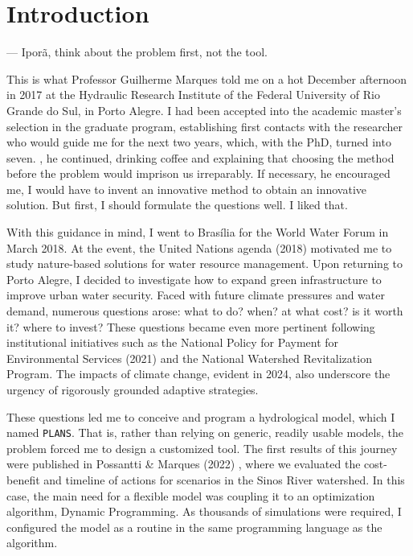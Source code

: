 \documentclass[./main_en.tex]{subfiles}
\begin{document}
\chapter{Introduction}

\setlength{\parskip}{\myparskip}

--- Iporã, think about the problem first, not the tool.

\vspace{1.0cm}

\noindent This is what Professor Guilherme Marques told me on a hot December afternoon in 2017 at the Hydraulic Research Institute of the Federal University of Rio Grande do Sul, in Porto Alegre. I had been accepted into the academic master's selection in the graduate program, establishing first contacts with the researcher who would guide me for the next two years, which, with the PhD, turned into seven. , he continued, drinking coffee and explaining that choosing the method before the problem would imprison us irreparably. If necessary, he encouraged me, I would have to invent an innovative method to obtain an innovative solution. But first, I should formulate the questions well. I liked that.

\par With this guidance in mind, I went to Brasília for the World Water Forum in March 2018. At the event, the United Nations agenda (2018) \cite{un2018} motivated me to study nature-based solutions for water resource management. Upon returning to Porto Alegre, I decided to investigate how to expand green infrastructure to improve urban water security. Faced with future climate pressures and water demand, numerous questions arose: what to do? when? at what cost? is it worth it? where to invest? These questions became even more pertinent following institutional initiatives such as the National Policy for Payment for Environmental Services (2021) \cite{brasil2021} and the National Watershed Revitalization Program. The impacts of climate change, evident in 2024, also underscore the urgency of rigorously grounded adaptive strategies.

\par These questions led me to conceive and program a hydrological model, which I named \texttt{PLANS}. That is, rather than relying on generic, readily usable models, the problem forced me to design a customized tool. The first results of this journey were published in Possantti \& Marques (2022) \cite{Possantti2022a}, where we evaluated the cost-benefit and timeline of actions for scenarios in the Sinos River watershed. In this case, the main need for a flexible model was coupling it to an optimization algorithm, Dynamic Programming. As thousands of simulations were required, I configured the model as a routine in the same programming language as the algorithm.
\end{document}
